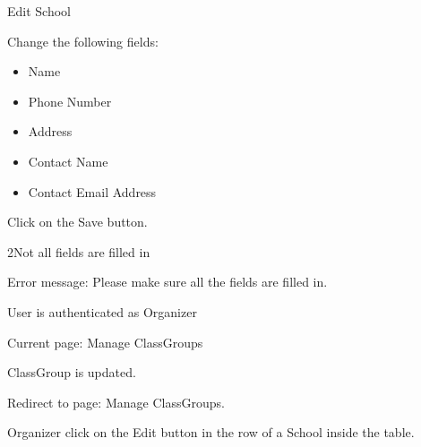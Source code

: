
\begin{uc}{Edit School}


    \begin{uc-mss}
    \item Change the following fields:
    	\begin{itemize}
			\item Name
			\item Phone Number
			\item Address
			\item Contact Name
			\item Contact Email Address
		\end{itemize}
    \item Click on the Save button.
    \end{uc-mss}
    
    \begin{uc-ext}
        
        \begin{uc-fail}{2}{Not all fields are filled in}
        \item Error message: Please make sure all the fields are filled in.
        \end{uc-fail}

    \end{uc-ext}

    \begin{uc-pre}
    \item User is authenticated as Organizer
    \item Current page: Manage ClassGroups
    \end{uc-pre}

    \begin{uc-post}
    \item ClassGroup is updated.
    \item Redirect to page: Manage ClassGroups.
    \end{uc-post}

    \begin{uc-trig}
        Organizer click on the Edit button in the row of a School inside the table.
    \end{uc-trig}

\end{uc}
